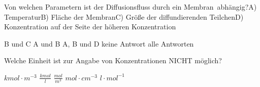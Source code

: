 \documentclass[11pt]{exam}
\begin{document}
\begin{questions}
\vspace{3mm}\question Von welchen Parametern ist der Diffusionsfluss durch ein Membran abhängig?A) TemperaturB) Fläche der MembranC) Größe der diffundierenden TeilchenD) Konzentration auf der Seite der höheren Konzentration

\begin{choices}
	\choice B und C
	\choice A und B
	\choice A, B und D
	\choice keine Antwort
	\choice alle Antworten
\end{choices}

\vspace{3mm}\question Welche Einheit ist zur Angabe von Konzentrationen NICHT möglich?

\begin{choices}
	\choice \( kmol \cdot m^{-3} \)
	\choice \( \frac{kmol}{l} \)
	\choice \( \frac{mol}{m^3} \)
	\choice \( mol \cdot cm^{-3} \)
	\choice \( l \cdot mol^{-1} \)
\end{choices}

\vspace{3mm}\end{questions}
\end{document}
